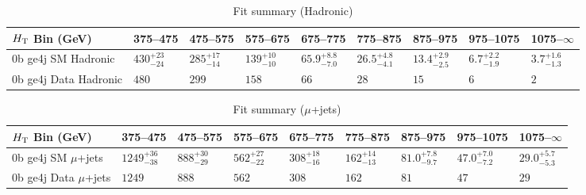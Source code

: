 \documentclass[8pt]{article}
\def\scalht{\mbox{$H_{\rm{T}}$}\xspace}
\newcommand\T{\rule{0pt}{2.6ex}}
\begin{document}
\begin{table}[ht!]
\caption{Fit summary (Hadronic)}
\label{tab:ensemble-summary}
\centering
\begin{tabular}{ lllllllll }

\hline
\scalht Bin (GeV)       & 375--475                       & 475--575                       & 575--675                       & 675--775                       & 775--875                       & 875--975                       & 975--1075                      & 1075--$\infty$                 \\ [1.000000ex]
\hline
0b ge4j SM Hadronic\T   & $430^{+23}_{-24}$              & $285^{+17}_{-14}$              & $139^{+10}_{-10}$              & $65.9^{+8.8}_{-7.0}$           & $26.5^{+4.8}_{-4.1}$           & $13.4^{+2.9}_{-2.5}$           & $6.7^{+2.2}_{-1.9}$            & $3.7^{+1.6}_{-1.3}$            \\ 
0b ge4j Data Hadronic\T & $480$                          & $299$                          & $158$                          & $66$                           & $28$                           & $15$                           & $6$                            & $2$                            \\ 
\hline

\end{tabular}
\end{table}
\begin{table}[ht!]
\caption{Fit summary ($\mu$+jets)}
\label{tab:ensemble-summary}
\centering
\begin{tabular}{ lllllllll }

\hline
\scalht Bin (GeV)       & 375--475                       & 475--575                       & 575--675                       & 675--775                       & 775--875                       & 875--975                       & 975--1075                      & 1075--$\infty$                 \\ [1.000000ex]
\hline
0b ge4j SM $\mu$+jets\T & $1249^{+36}_{-38}$             & $888^{+30}_{-29}$              & $562^{+27}_{-22}$              & $308^{+18}_{-16}$              & $162^{+14}_{-13}$              & $81.0^{+7.8}_{-9.7}$           & $47.0^{+7.0}_{-7.2}$           & $29.0^{+5.7}_{-5.3}$           \\ 
0b ge4j Data $\mu$+jets\T & $1249$                         & $888$                          & $562$                          & $308$                          & $162$                          & $81$                           & $47$                           & $29$                           \\ 
\hline

\end{tabular}
\end{table}
\end{document}
